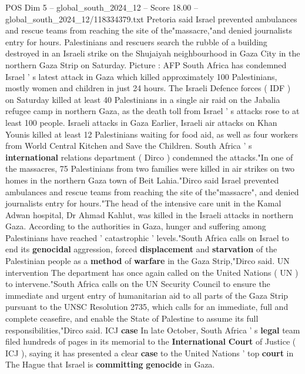 \begin{textsample}{POS Dim 5 – global\_south\_2024\_12 – Score 18.00 – global\_south\_2024\_12/118334379.txt}  \label{ex:f5_pos_045}
Pretoria said Israel prevented ambulances and rescue teams from reaching the site of the"massacre,"and denied journalists entry for hours.
Palestinians and rescuers search the rubble of a building destroyed in an Israeli strike on the Shujaiyah neighbourhood in Gaza City in the northern Gaza Strip on Saturday.
Picture : AFP South Africa has condemned Israel ' s latest attack in Gaza which killed approximately 100 Palestinians, mostly women and children in just 24 hours.
The Israeli Defence forces ( IDF ) on Saturday killed at least 40 Palestinians in a single air raid on the Jabalia refugee camp in northern Gaza, as the death toll from Israel ' s attacks rose to at least 100 people.
Israeli attacks in Gaza Earlier, Israeli air attacks on Khan Younis killed at least 12 Palestinians waiting for food aid, as well as four workers from World Central Kitchen and Save the Children.
South Africa ' s \textbf{international} relations department ( Dirco ) condemned the attacks."In one of the massacres, 75 Palestinians from two families were killed in air strikes on two homes in the northern Gaza town of Beit Lahia."Dirco said Israel prevented ambulances and rescue teams from reaching the site of the"massacre", and denied journalists entry for hours."The head of the intensive care unit in the Kamal Adwan hospital, Dr Ahmad Kahlut, was killed in the Israeli attacks in northern Gaza.
According to the authorities in Gaza, hunger and suffering among Palestinians have reached ' catastrophic ' levels."South Africa calls on Israel to end its \textbf{genocidal} aggression, forced \textbf{displacement} and \textbf{starvation} of the Palestinian people as a \textbf{method} of \textbf{warfare} in the Gaza Strip,"Dirco said.
UN intervention The department has once again called on the United Nations ( UN ) to intervene."South Africa calls on the UN Security Council to ensure the immediate and urgent entry of humanitarian aid to all parts of the Gaza Strip pursuant to the UNSC Resolution 2735, which calls for an immediate, full and complete ceasefire, and enable the State of Palestine to assume its full responsibilities,"Dirco said.
ICJ \textbf{case} In late October, South Africa ' s \textbf{legal} team filed hundreds of pages in its memorial to the \textbf{International} \textbf{Court} of Justice ( ICJ ), saying it has presented a clear \textbf{case} to the United Nations ' top \textbf{court} in The Hague that Israel is \textbf{committing} \textbf{genocide} in Gaza.

\end{textsample}
